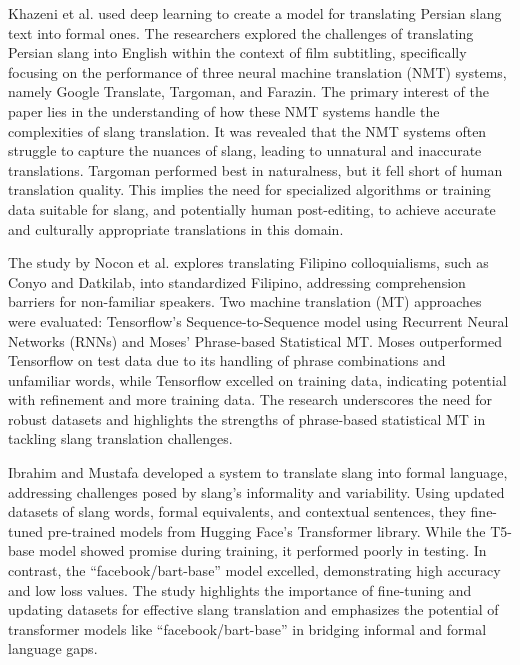 Khazeni et al. \cite{Khazeni} used deep learning to create a model for translating Persian slang text into formal ones. The researchers explored the challenges of translating Persian slang into English within the context of film subtitling, specifically focusing on the performance of three neural machine translation (NMT) systems, namely Google Translate, Targoman, and Farazin. The primary interest of the paper lies in the understanding of how these NMT systems handle the complexities of slang translation. It was revealed that the NMT systems often struggle to capture the nuances of slang, leading to unnatural and inaccurate translations. Targoman performed best in naturalness, but it fell short of human translation quality. This implies the need for specialized algorithms or training data suitable for slang, and potentially human post-editing, to achieve accurate and culturally appropriate translations in this domain.
 
The study by Nocon et al. \cite{Nocon_Kho_Arroyo_2018} explores translating Filipino colloquialisms, such as Conyo and Datkilab, into standardized Filipino, addressing comprehension barriers for non-familiar speakers. Two machine translation (MT) approaches were evaluated: Tensorflow's Sequence-to-Sequence model using Recurrent Neural Networks (RNNs) and Moses' Phrase-based Statistical MT. Moses outperformed Tensorflow on test data due to its handling of phrase combinations and unfamiliar words, while Tensorflow excelled on training data, indicating potential with refinement and more training data. The research underscores the need for robust datasets and highlights the strengths of phrase-based statistical MT in tackling slang translation challenges.

Ibrahim and Mustafa \cite{Abdulstar_Ibrahim_Shareef_Mustafa_2023} developed a system to translate slang into formal language, addressing challenges posed by slang's informality and variability. Using updated datasets of slang words, formal equivalents, and contextual sentences, they fine-tuned pre-trained models from Hugging Face's Transformer library. While the T5-base model showed promise during training, it performed poorly in testing. In contrast, the “facebook/bart-base” model excelled, demonstrating high accuracy and low loss values. The study highlights the importance of fine-tuning and updating datasets for effective slang translation and emphasizes the potential of transformer models like “facebook/bart-base” in bridging informal and formal language gaps. 


